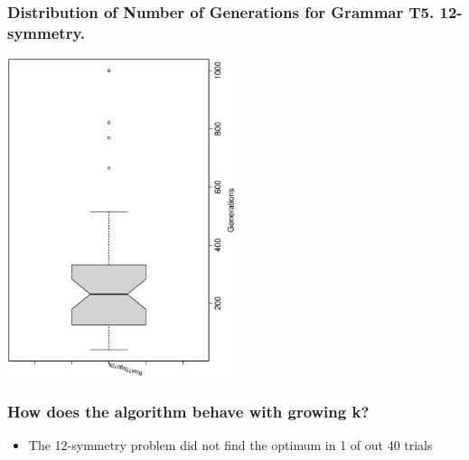 \documentclass[18pt,c]{beamer}
\makeatletter
\let\beamer@writeslidentry@miniframeson=\beamer@writeslidentry
\newcommand*{\miniframeson}{\let\beamer@writeslidentry=\beamer@writeslidentry@miniframeson}
\makeatother
\begin{document}
 \begin{frame}
 \frametitle{ Distribution of Number of Generations for Grammar T5. 12-symmetry. }
 \begin{center}
\includegraphics[width=0.5\textwidth, angle=-90]
{ExpFboxplottGenerations010.eps}
 \end{center}
 \label{ExpFboxplottGenerations010.eps}  
 \end{frame}

\begin{frame}
\frametitle{
How does the algorithm behave with growing k?
}
\begin{itemize}
\item The 12-symmetry problem did not find the optimum in 1 of out 40 trials
\end{itemize}
\end{frame}%
\miniframeson
\end{document}
